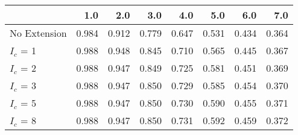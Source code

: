 \begin{tabular}{lrrrrrrr}
\toprule
{} &   1.0 &   2.0 &   3.0 &   4.0 &   5.0 &   6.0 &   7.0 \\
\midrule
No Extension & 0.984 & 0.912 & 0.779 & 0.647 & 0.531 & 0.434 & 0.364 \\
$I_c$ = 1    & 0.988 & 0.948 & 0.845 & 0.710 & 0.565 & 0.445 & 0.367 \\
$I_c$ = 2    & 0.988 & 0.947 & 0.849 & 0.725 & 0.581 & 0.451 & 0.369 \\
$I_c$ = 3    & 0.988 & 0.947 & 0.850 & 0.729 & 0.585 & 0.454 & 0.370 \\
$I_c$ = 5    & 0.988 & 0.947 & 0.850 & 0.730 & 0.590 & 0.455 & 0.371 \\
$I_c$ = 8    & 0.988 & 0.947 & 0.850 & 0.731 & 0.592 & 0.459 & 0.372 \\
\bottomrule
\end{tabular}
